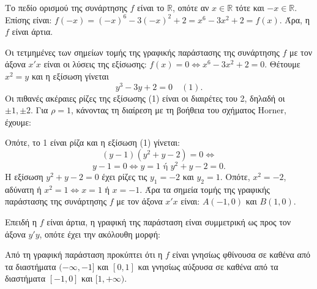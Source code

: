 \begin{alist}
\item Το πεδίο ορισμού της συνάρτησης $f$ είναι το $\mathbb{R}$, οπότε αν $x \in \mathbb{R}$ τότε και $-x \in \mathbb{R}$.
Επίσης είναι: $f(-x) = (-x)^6 - 3(-x)^2 + 2 = x^6 - 3x^2 + 2 = f(x)$.
Άρα, η $f$ είναι άρτια.
\item Οι τετμημένες των σημείων τομής της γραφικής παράστασης της συνάρτησης $f$ με τον άξονα $x'x$ είναι οι λύσεις της εξίσωσης: $f(x) = 0 \Leftrightarrow x^6 - 3x^2 + 2 = 0$.
Θέτουμε $x^2 = y$ και η εξίσωση γίνεται
\[y^3 - 3y + 2 = 0 \quad (1).\]
Οι πιθανές ακέραιες ρίζες της εξίσωσης (1) είναι οι διαιρέτες του 2, δηλαδή οι $\pm 1, \pm 2$. Για $\rho = 1$, κάνοντας τη διαίρεση με τη βοήθεια του σχήματος Horner, έχουμε:
\begin{center}
\end{center}
Οπότε, το 1 είναι ρίζα και η εξίσωση (1) γίνεται:
\[(y - 1)(y^2 + y - 2) = 0 \Leftrightarrow\]
\[y - 1 = 0 \Leftrightarrow y = 1 \text{ ή } y^2 + y - 2 = 0.\]
Η εξίσωση $y^2 + y - 2 = 0$ έχει ρίζες τις $y_1 = -2$ και $y_2 = 1$.
Οπότε, $x^2 = -2$, αδύνατη ή $x^2 = 1 \Leftrightarrow x = 1$ ή $x = -1$.
Άρα τα σημεία τομής της γραφικής παράστασης της συνάρτησης $f$ με τον άξονα $x'x$ είναι: $A(-1, 0)$ και $B(1, 0)$.
\item Επειδή η $f$ είναι άρτια, η γραφική της παράσταση είναι συμμετρική ως προς τον άξονα $y'y$, οπότε έχει την ακόλουθη μορφή:
\begin{center}
\end{center}
\item Από τη γραφική παράσταση προκύπτει ότι η $f$ είναι γνησίως φθίνουσα σε καθένα από τα διαστήματα $(-\infty, -1]$ και $[0, 1]$ και γνησίως αύξουσα σε καθένα από τα διαστήματα $[-1, 0]$ και $[1, +\infty)$.
\end{alist}

